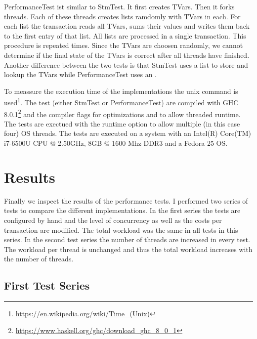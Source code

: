 PerformanceTest ist similar to StmTest. It first creates  TVars. Then it forks  threads. Each of these 
threads creates  lists ramdomly with  TVars in each. For each list the transaction reads all TVars,
sums their values and writes them back to the first entry of that list. All lists are processed in a single transaction. 
This procedure is repeated  times. Since the TVars are choosen randomly, we cannot determine if the final state
of the TVars is correct after all threads have finished. Another difference between the two tests is that StmTest uses a list to 
store and lookup the TVars while PerformanceTest uses an .

To meassure the execution time of the implementations the unix  command is used\footnote{\url{https://en.wikipedia.org/wiki/Time_(Unix)}}.
The test (either StmTest or PerformanceTest) are compiled with GHC 8.0.1\footnote{\url{https://www.haskell.org/ghc/download_ghc_8_0_1}} and the 
compiler flags  for optimizations and  to allow threaded runtime. The tests are exectued with the runtime option  
to allow multiple (in this case four) OS threads. The tests are executed on a system with an Intel(R) Core(TM) i7-6500U CPU @ 2.50GHz,
8GB @ 1600 Mhz DDR3 and a Fedora 25 OS. 


\section{Results}
Finally we inspect the results of the performance tests. I performed two series of tests to compare the different implementations.
In the first series the tests are configured by hand and the level of concurrency as well as the costs per transaction are modified.
The total workload was the same in all tests in this series. In the second test series the number of threads are increased in every
test. The workload per thread is unchanged and thus the total workload increases with the number of threads. 

\subsection{First Test Series}


